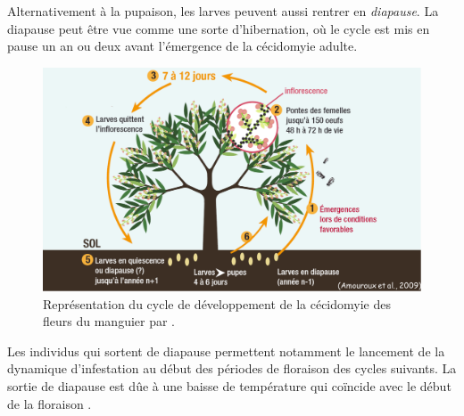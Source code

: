 Alternativement à la pupaison, les larves peuvent aussi rentrer en \emph{diapause}.
La diapause peut être vue comme une sorte d'hibernation, où le cycle est mis en pause un an ou deux avant l'émergence de la cécidomyie adulte.


%
\begin{figure}
 \centering
 \includegraphics[scale = 0.33]{photos/cycle.png}
 \caption{Représentation du cycle de développement de la cécidomyie des fleurs du manguier par \citet{paulguide}.}
 \label{fig:cycle}
\end{figure}
%


Les individus qui sortent de diapause permettent notamment le lancement de la dynamique d'infestation au début des périodes de floraison des cycles suivants.
La sortie de diapause est dûe à une baisse de température qui coïncide avec le début de la floraison \citep{pauldiap}.
























